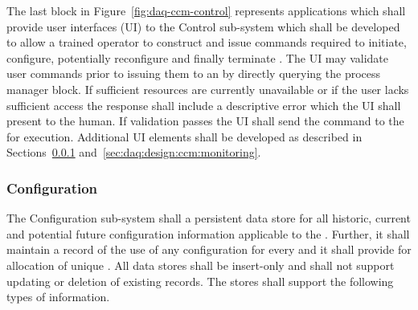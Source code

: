 The last block in Figure~\ref{fig:daq-ccm-control} represents applications which shall provide user interfaces (UI) to the Control sub-system which shall be developed to allow a trained operator to construct and issue commands required to initiate, configure, potentially reconfigure and finally terminate . 
The UI may validate user commands prior to issuing them to an  by directly querying the process manager block. 
If sufficient resources are currently unavailable or if the user lacks sufficient access the response shall include a descriptive error which the UI shall present to the human.
If validation passes the UI shall send the command to the  for execution. 
Additional UI elements shall be developed as described in Sections~\ref{sec:daq:design:ccm:configuration} and~\ref{sec:daq:design:ccm:monitoring}.


\subsubsection{Configuration}
\label{sec:daq:design:ccm:configuration}

The  Configuration sub-system shall a persistent data store for all historic, current and potential future configuration information applicable to the .
Further, it shall maintain a record of the use of any configuration for every  and it shall provide for allocation of unique . 
All data stores shall be insert-only and shall not support updating or deletion of existing records.
The stores shall support the following types of information.

